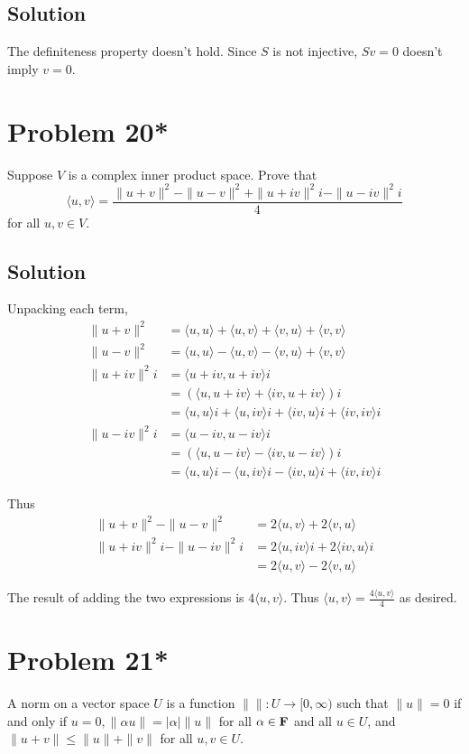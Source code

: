 \documentclass{article}
\begin{document}
\subsection*{Solution}
The definiteness property doesn't hold. Since $S$ is not injective, $Sv=0$ doesn't imply $v=0$.

\section*{Problem 20*}
Suppose $V$ is a complex inner product space. Prove that
\[\langle u,v\rangle=\frac{\|u+v\|^2-\|u-v\|^2+\|u+iv\|^2i-\|u-iv\|^2i}{4}\]
for all $u,v\in V$.

\subsection*{Solution}
Unpacking each term,
\begin{align*}
    \|u+v\|^2&=\langle u,u\rangle+\langle u,v\rangle+\langle v,u\rangle+\langle v,v\rangle\\
    \|u-v\|^2&=\langle u,u\rangle-\langle u,v\rangle-\langle v,u\rangle+\langle v,v\rangle\\
    \|u+iv\|^2i&=\langle u+iv,u+iv\rangle i\\
               &=(\langle u, u+iv\rangle+\langle iv,u+iv\rangle)i\\
               &=\langle u,u\rangle i+\langle u, iv\rangle i+\langle iv,u\rangle i+\langle iv,iv\rangle i\\
    \|u-iv\|^2i&=\langle u-iv,u-iv\rangle i\\
               &=(\langle u, u-iv\rangle-\langle iv,u-iv\rangle)i\\
               &=\langle u,u\rangle i-\langle u,iv\rangle i-\langle iv,u\rangle i+\langle iv,iv\rangle i
\end{align*}

Thus
\begin{align*}
    \|u+v\|^2-\|u-v\|^2&=2\langle u,v\rangle+2\langle v,u\rangle\\
    \|u+iv\|^2i-\|u-iv\|^2i&=2\langle u,iv\rangle i+2\langle iv, u\rangle i\\
      &=2\langle u,v\rangle-2\langle v,u\rangle
\end{align*}

The result of adding the two expressions is $4\langle u,v\rangle$. Thus $\langle u,v\rangle=\frac{4\langle u,v\rangle}{4}$ as desired.

\section*{Problem 21*}
A norm on a vector space $U$ is a function $\|\|:U\to[0,\infty)$ such that $\|u\|=0$ if and only if $u=0,\|\alpha u\|=|\alpha|\|u\|$ for all $\alpha\in\mathbf{F}$ and all $u\in U$, and $\|u+v\|\leq\|u\|+\|v\|$ for all $u,v\in U$.
\end{document}
